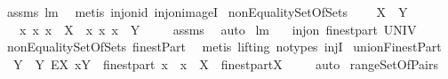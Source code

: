 \begin{isabellebody}
%
\isatagproof
{}\isamarkupfalse%
\ assms\ lm{}{}{}\ \isamarkupfalse%
\ {\isacharparenleft}metis\ inj{\isacharunderscore}on{\isacharunderscore}id\ inj{\isacharunderscore}on{\isacharunderscore}imageI{\isacharparenright}%
\endisatagproof
{\isafoldproof}%
%
\isadelimproof
\isanewline
%
\endisadelimproof
\isanewline
{}\isamarkupfalse%
\ nonEqualitySetOfSets{\isacharcolon}\ \isanewline
\ \ \ {\isachardoublequoteopen}X\ {\isasymnoteq}\ Y{\isachardoublequoteclose}\ \isanewline
\ \ \ {\isachardoublequoteopen}{\isacharbraceleft}{\isacharbraceleft}x{\isacharbraceright}{\isacharbar}\ x{\isachardot}\ x\ {\isasymin}\ X{\isacharbraceright}\ {\isasymnoteq}\ {\isacharbraceleft}{\isacharbraceleft}x{\isacharbraceright}{\isacharbar}\ x{\isachardot}\ x\ {\isasymin}\ Y{\isacharbraceright}{\isachardoublequoteclose}\ \isanewline
%
\isadelimproof
\ \ %
\endisadelimproof
%
\isatagproof
{}\isamarkupfalse%
\ assms\ \isamarkupfalse%
\ auto%
\endisatagproof
{\isafoldproof}%
%
\isadelimproof
\isanewline
%
\endisadelimproof
\isanewline
{}\isamarkupfalse%
\ lm{}{}{}{\isacharcolon}\ \isanewline
\ \ {\isachardoublequoteopen}inj{\isacharunderscore}on\ finestpart\ UNIV{\isachardoublequoteclose}\ \isanewline
%
\isadelimproof
\ \ %
\endisadelimproof
%
\isatagproof
{}\isamarkupfalse%
\ nonEqualitySetOfSets\ finestPart\ \isamarkupfalse%
\ {\isacharparenleft}metis\ {\isacharparenleft}lifting{\isacharcomma}\ no{\isacharunderscore}types{\isacharparenright}\ injI{\isacharparenright}%
\endisatagproof
{\isafoldproof}%
%
\isadelimproof
\isanewline
%
\endisadelimproof
\isanewline
\isanewline
{}\isamarkupfalse%
\ unionFinestPart{\isacharcolon}\ \isanewline
\ \ {\isachardoublequoteopen}{\isacharbraceleft}Y\ {\isacharbar}\ Y{\isachardot}\ EX\ x{\isachardot}{\isacharparenleft}{\isacharparenleft}Y\ {\isasymin}\ finestpart\ x{\isacharparenright}\ {\isacharampersand}\ {\isacharparenleft}x\ {\isasymin}\ X{\isacharparenright}{\isacharparenright}{\isacharbraceright}\ {\isacharequal}\ {\isasymUnion}{\isacharparenleft}finestpart{\isacharbackquote}X{\isacharparenright}{\isachardoublequoteclose}\ \isanewline
%
\isadelimproof
\ \ %
\endisadelimproof
%
\isatagproof
{}\isamarkupfalse%
\ auto%
\endisatagproof
{\isafoldproof}%
%
\isadelimproof
\isanewline
%
\endisadelimproof
\isanewline
\isanewline
{}\isamarkupfalse%
\ rangeSetOfPairs{\isacharcolon}\ \isanewline

\end{isabellebody}
